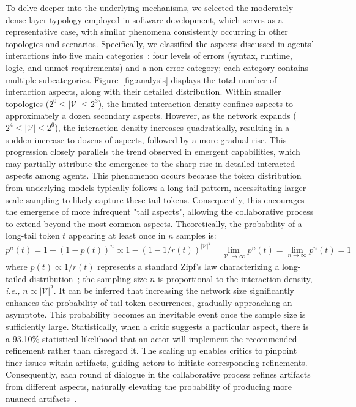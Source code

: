 \documentclass{article}
\newcommand{\ie}{\textit{i.e., }}
\begin{document}
To delve deeper into the underlying mechanisms, we selected the moderately-dense layer typology employed in software development, which serves as a representative case, with similar phenomena consistently occurring in other topologies and scenarios.
Specifically, we classified the aspects discussed in agents' interactions into five main categories~\citep{Wonseok2022PyTER,Kohn2019The}: four levels of errors (syntax, runtime, logic, and unmet requirements) and a non-error category; each category contains multiple subcategories.
Figure~\ref{fig:analysis} displays the total number of interaction aspects, along with their detailed distribution.
Within smaller topologies (\(2^0 \leq |\mathcal{V}| \leq 2^3\)), the limited interaction density confines aspects to approximately a dozen secondary aspects. However, as the network expands (\(2^4 \leq |\mathcal{V}| \leq 2^6\)), the interaction density increases quadratically, resulting in a sudden increase to dozens of aspects, followed by a more gradual rise. 
This progression closely parallels the trend observed in emergent capabilities, which may partially attribute the emergence to the sharp rise in detailed interacted aspects among agents.
This phenomenon occurs because the token distribution from underlying models typically follows a long-tail pattern, necessitating larger-scale sampling to likely capture these tail tokens.
Consequently, this encourages the emergence of more infrequent "tail aspects", allowing the collaborative process to extend beyond the most common aspects.
Theoretically, the probability of a long-tail token \( t \) appearing at least once in \( n \) samples is:
\begin{equation}
p^n(t) = 1 - \left(1-p(t)\right)^n \propto 1 - \left(1-1/r(t)\right)^{|\mathcal{V}|^2} \quad \lim_{|\mathcal{V}| \rightarrow \infty} p^n(t) = \lim_{n \rightarrow \infty} p^n(t) = 1
\end{equation}
where \( p(t) \propto 1/r(t) \) represents a standard Zipf's law characterizing a long-tailed distribution~\citep{Newman2005Power}; the sampling size \( n \) is proportional to the interaction density, \ie \( n \propto |\mathcal{V}|^2 \). It can be inferred that increasing the network size significantly enhances the probability of tail token occurrences, gradually approaching an asymptote. This probability becomes an inevitable event once the sample size is sufficiently large.
Statistically, when a critic suggests a particular aspect, there is a 93.10\% statistical likelihood that an actor will implement the recommended refinement rather than disregard it. The scaling up enables critics to pinpoint finer issues within artifacts, guiding actors to initiate corresponding refinements. Consequently, each round of dialogue in the collaborative process refines artifacts from different aspects, naturally elevating the probability of producing more nuanced artifacts~\citep{Liang2024Encouraging,Du2024Improving,Cohen2023LM}.
\end{document}
